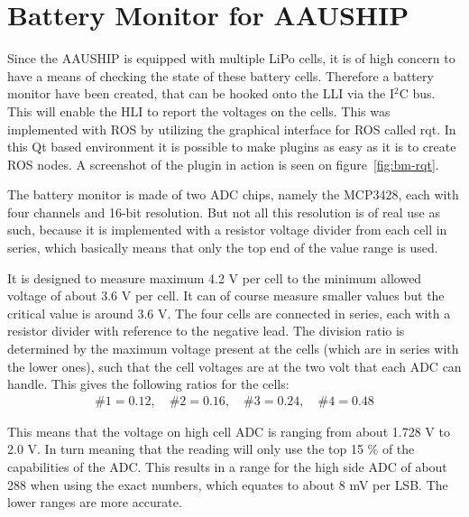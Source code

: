 \chapter{Battery Monitor for AAUSHIP}
\label{ch:bm}


Since the AAUSHIP is equipped with multiple LiPo cells, it is of high concern to have a means of checking the state of these battery cells.
Therefore a battery monitor have been created, that can be hooked onto the
\ac{LLI} via the I$^2$C bus. This will enable the \ac{HLI} to report
the voltages on the cells. This was implemented with \ac{ROS} by
utilizing the graphical interface for \ac{ROS} called rqt. In this Qt
based environment it is possible to make plugins as easy as it is to
create \ac{ROS} nodes. A screenshot of the plugin in action is seen
on figure~\vref{fig:bm-rqt}.

The battery monitor is made of two \ac{ADC} chips, namely the MCP3428,
each with four channels and 16-bit resolution. But not all this
resolution is of real use as such, because it is implemented with a
resistor voltage divider from each cell in series, which basically
means that only the top end of the value range is used. 

It is designed to measure maximum 4.2 V per cell to the minimum
allowed voltage of about 3.6 V per cell. It can of course measure
smaller values but the critical value is around 3.6 V. The four cells are connected in series, each with a resistor divider with
reference to the negative lead. The division ratio is determined by
the maximum voltage present at the cells (which are in series with the
lower ones), such that the cell voltages are at the two volt that
each \ac{ADC} can handle. This gives the following ratios for the
cells:
\begin{align}
	\#1 = 0.12, \quad \#2 = 0.16, \quad \#3 = 0.24, \quad \#4 = 0.48
\end{align}

This means that the voltage on high cell \ac{ADC} is ranging from
about 1.728 V to 2.0 V. In turn meaning that the reading will only use
the top 15 \% of the capabilities of the \ac{ADC}. This results in a
range for the high side \ac{ADC} of about 288 when using the exact
numbers, which equates to about 8 mV per \ac{LSB}. The lower ranges
are more accurate.

